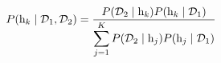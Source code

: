 \begin{equation}
    P( \mathrm{h}_{k} \mid \mathcal{D}_1, \mathcal{D}_2 ) = \frac{P( \mathcal{D}_2 \mid \mathrm{h}_{k} ) P( \mathrm{h}_{k} \mid \mathcal{D}_1 )}{\displaystyle\sum_{j=1}^{K} P( \mathcal{D}_2 \mid \mathrm{h}_{j} ) P( \mathrm{h}_{j} \mid \mathcal{D}_1 )}
    \label{eq:bayesian_update_step2_final}
\end{equation}


